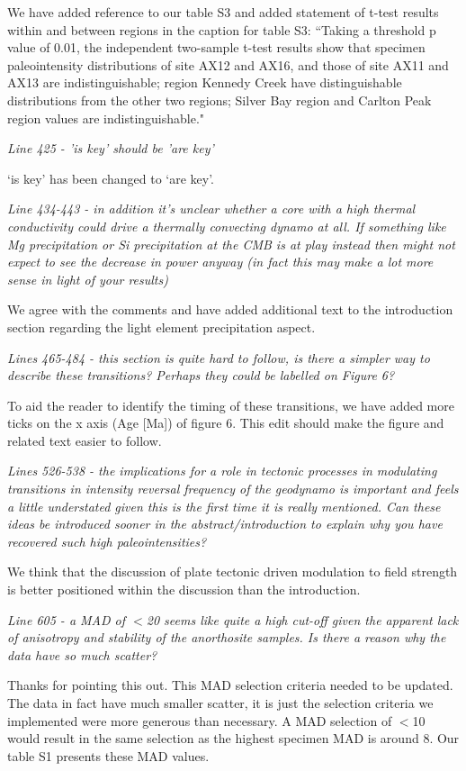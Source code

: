 \documentclass[11pt, letterpaper]{article}
\begin{document}
\begin{flushleft}
We have added reference to our table S3 and added statement of t-test results within and between regions in the caption for table S3: ``Taking a threshold p value of 0.01, the independent two-sample t-test results show that specimen paleointensity distributions of site AX12 and AX16, and those of site AX11 and AX13 are indistinguishable; region Kennedy Creek have distinguishable distributions from the other two regions; Silver Bay region and Carlton Peak region values are indistinguishable."

\textit{Line 425 - 'is key' should be 'are key'}

`is key' has been changed to `are key'. 

\textit{Line 434-443 - in addition it's unclear whether a core with a high thermal conductivity could drive a thermally convecting dynamo at all. If something like Mg precipitation or Si precipitation at the CMB is at play instead then might not expect to see the decrease in power anyway (in fact this may make a lot more sense in light of your results)}

We agree with the comments and have added additional text to the introduction section regarding the light element precipitation aspect. 

\textit{Lines 465-484 - this section is quite hard to follow, is there a simpler way to describe these transitions? Perhaps they could be labelled on Figure 6?}

To aid the reader to identify the timing of these transitions, we have added more ticks on the x axis (Age [Ma]) of figure 6. This edit should make the figure and related text easier to follow.  

\textit{Lines 526-538 - the implications for a role in tectonic processes in modulating transitions in intensity\/ reversal frequency of the geodynamo is important and feels a little understated given this is the first time it is really mentioned. Can these ideas be introduced sooner in the abstract/introduction to explain why you have recovered such high paleointensities?}

We think that the discussion of plate tectonic driven modulation to field strength is better positioned within the discussion than the introduction. 

\textit{Line 605 - a MAD of $<$20 seems like quite a high cut-off given the apparent lack of anisotropy and stability of the anorthosite samples. Is there a reason why the data have so much scatter?}

Thanks for pointing this out. This MAD selection criteria needed to be updated. The data in fact have much smaller scatter, it is just the selection criteria we implemented were more generous than necessary. A MAD selection of $<$10 would result in the same selection as the highest specimen MAD is around 8. Our table S1 presents these MAD values. 


\end{flushleft}
\end{document}

